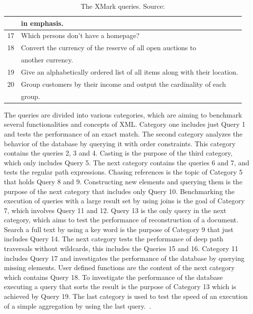 \begin {table}[htpb]
\begin{tabular}{r|l}
	  &in emphasis.\\
	  \hline
	  17&Which persons don't have a homepage?\\
	  \hline
	  18&Convert the currency of the reserve of all open auctions to\\
	  &another currency.\\
	  \hline
	  19&Give an alphabetically ordered list of all items along with their location.\\
	  \hline
	  20&Group customers by their income and output the cardinality of each\\
	  &group.\\
	  \hline
	\end{tabular}
	\caption {The XMark queries. Source:\cite{schmidtxmark}}
\label {tab:xmark-queries}
\end {table}


The queries are divided into various categories, which are aiming to benchmark several functionalities and concepts of XML.
Category one includes just Query 1 and tests the performance of an exact match.
The second category analyzes the behavior of the database by querying it with order constraints.
This category contains the queries 2, 3 and 4.
Casting is the purpose of the third category, which only includes Query 5.
The next category contains the queries 6 and 7, and tests the regular path expressions.
Chasing references is the topic of Category 5 that holds Query 8 and 9.
Constructing new elements and querying them is the purpose of the next category that includes only Query 10.
Benchmarking the execution of queries with a large result set by using joins is the goal of Category 7, which involves Query 11 and 12.
Query 13 is the only query in the next category, which aims to test the performance of reconstruction of a document.
Search a full text by using a key word is the purpose of Category 9 that just includes Query 14.
The next category tests the performance of deep path traversals without wildcards, this includes the Queries 15 and 16.
Category 11 includes Query 17 and investigates the performance of the database by querying missing elements.
User defined functions are the content of the next category which contains Query 18.
To investigate the performance of the database executing a query that sorts the result is the purpose of Category 13 which is achieved by Query 19.
The last category is used to test the speed of an execution of a simple aggregation by using the last query.~\cite{schmidtxmark}.

